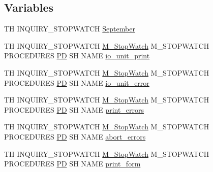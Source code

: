 \subsection*{Variables}
\begin{DoxyCompactItemize}
\item 
TH I\+N\+Q\+U\+I\+R\+Y\+\_\+\+S\+T\+O\+P\+W\+A\+T\+CH \hyperlink{inquiry__stopwatch_83_8txt_a5343cd7a514240c99a373cb1e09e1d08}{September}
\item 
TH I\+N\+Q\+U\+I\+R\+Y\+\_\+\+S\+T\+O\+P\+W\+A\+T\+CH \hyperlink{option__stopwatch_83_8txt_aa2011fc45a5e502e87ee50996a8a9305}{M\+\_\+\+Stop\+Watch} M\+\_\+\+S\+T\+O\+P\+W\+A\+T\+CH P\+R\+O\+C\+E\+D\+U\+R\+ES \hyperlink{what__overview_81_8txt_a85f26da5a4481fbdb0d9c79f2b94de3e}{PD} SH N\+A\+ME \hyperlink{inquiry__stopwatch_83_8txt_ad67f5f613d63ccb3ff87efe190d2c9c1}{io\+\_\+unit\+\_\+print}
\item 
TH I\+N\+Q\+U\+I\+R\+Y\+\_\+\+S\+T\+O\+P\+W\+A\+T\+CH \hyperlink{option__stopwatch_83_8txt_aa2011fc45a5e502e87ee50996a8a9305}{M\+\_\+\+Stop\+Watch} M\+\_\+\+S\+T\+O\+P\+W\+A\+T\+CH P\+R\+O\+C\+E\+D\+U\+R\+ES \hyperlink{what__overview_81_8txt_a85f26da5a4481fbdb0d9c79f2b94de3e}{PD} SH N\+A\+ME \hyperlink{inquiry__stopwatch_83_8txt_a3a3ade1e4c01a51287544ea767e3512a}{io\+\_\+unit\+\_\+error}
\item 
TH I\+N\+Q\+U\+I\+R\+Y\+\_\+\+S\+T\+O\+P\+W\+A\+T\+CH \hyperlink{option__stopwatch_83_8txt_aa2011fc45a5e502e87ee50996a8a9305}{M\+\_\+\+Stop\+Watch} M\+\_\+\+S\+T\+O\+P\+W\+A\+T\+CH P\+R\+O\+C\+E\+D\+U\+R\+ES \hyperlink{what__overview_81_8txt_a85f26da5a4481fbdb0d9c79f2b94de3e}{PD} SH N\+A\+ME \hyperlink{inquiry__stopwatch_83_8txt_a70e15afb456eff58f321ed840953c7f5}{print\+\_\+errors}
\item 
TH I\+N\+Q\+U\+I\+R\+Y\+\_\+\+S\+T\+O\+P\+W\+A\+T\+CH \hyperlink{option__stopwatch_83_8txt_aa2011fc45a5e502e87ee50996a8a9305}{M\+\_\+\+Stop\+Watch} M\+\_\+\+S\+T\+O\+P\+W\+A\+T\+CH P\+R\+O\+C\+E\+D\+U\+R\+ES \hyperlink{what__overview_81_8txt_a85f26da5a4481fbdb0d9c79f2b94de3e}{PD} SH N\+A\+ME \hyperlink{inquiry__stopwatch_83_8txt_a3a9b41223396c066db320e657bd8cba4}{abort\+\_\+errors}
\item 
TH I\+N\+Q\+U\+I\+R\+Y\+\_\+\+S\+T\+O\+P\+W\+A\+T\+CH \hyperlink{option__stopwatch_83_8txt_aa2011fc45a5e502e87ee50996a8a9305}{M\+\_\+\+Stop\+Watch} M\+\_\+\+S\+T\+O\+P\+W\+A\+T\+CH P\+R\+O\+C\+E\+D\+U\+R\+ES \hyperlink{what__overview_81_8txt_a85f26da5a4481fbdb0d9c79f2b94de3e}{PD} SH N\+A\+ME \hyperlink{inquiry__stopwatch_83_8txt_a0a3b09cc37d1f592e66a07c0c8a31cba}{print\+\_\+form}

\end{DoxyCompactItemize}
